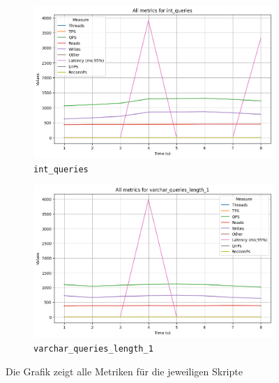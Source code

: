 \vspace{-5pt}
\begin{figure}[H]
    \centering
    \begin{subfigure}[t]{0.48\textwidth}
        \centering
        \includegraphics[width=\textwidth]{PNGs/Join_Type/int_queries}
        \caption{\texttt{int\_queries}}
        \label{join-typ-int_queries}
    \end{subfigure}
    \hfill
    \begin{subfigure}[t]{0.48\textwidth}
        \centering
        \includegraphics[width=\textwidth]{PNGs/Join_Type/varchar_queries_length_1}
        \caption{\texttt{varchar\_queries\_length\_1}}
        \label{join-typ-varchar_queries_length_1}
    \end{subfigure}
    \caption[Join-Typ: Skriptvergleich]{Die Grafik zeigt alle Metriken für die jeweiligen Skripte}
    \label{fig:join-typ-comp-script}
\end{figure}
\vspace{-20pt}

